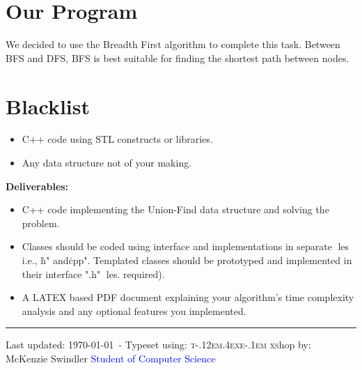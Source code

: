 \documentclass{article}
\begin{document}
\section*{Our Program}
We decided to use the Breadth First algorithm to complete this task. Between BFS and DFS, BFS is best suitable for finding the shortest path between nodes.

\section*{Blacklist}
\begin{itemize}
  \item C++ code using STL constructs or libraries.
  \item Any data structure not of your making.
\end{itemize}

\textbf{Deliverables:}
\begin{itemize}
  \item C++ code implementing the Union-Find data structure and solving the problem.
  \item Classes should be coded using interface and implementations in separate les i.e., \.h" and\.cpp". Templated classes should be prototyped and implemented in their interface ".h" les. required).
  \item A LATEX based PDF document explaining your algorithm's time complexity analysis and any
optional features you implemented.
\end{itemize}

\vfill
\hrule

\begin{center}
{\scriptsize Last updated: \today\ - Typeset using: \textsc{t\kern -.12em\lower.4ex\hbox{e}\kern-.1em xs}hop by:\\ McKenzie Swindler \textcolor{blue}{Student of Computer Science} }
\end{center}
\end{document}
